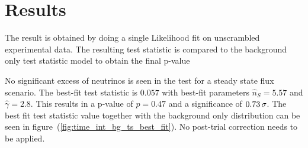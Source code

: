 \section{Results}
The result is obtained by doing a single Likelihood fit on unscrambled experimental data.
The resulting test statistic is compared to the background only test statistic model to obtain the final p-value

No significant excess of neutrinos is seen in the test for a steady state flux scenario.
The best-fit test statistic is $\num{0.057}$ with best-fit parameters $\hat{n}_S = \num{5.57}$ and $\hat{\gamma} = \num{2.8}$.
This results in a p-value of $p=0.47$ and a significance of $\num{0.73}\,\sigma$.
The  best fit test statistic value together with the background only distribution can be seen in figure~(\ref{fig:time_int_bg_ts_best_fit}).
No post-trial correction needs to be applied.


